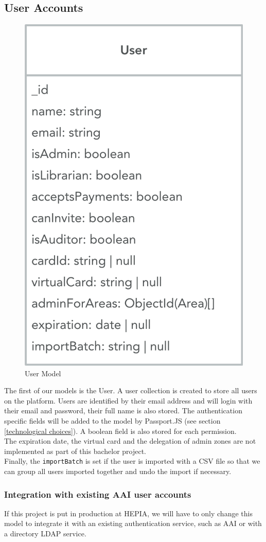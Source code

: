 \documentclass[11pt,a4paper]{report}
\begin{document}
\subsection{User Accounts}
\begin{figure}[H]
\begin{center}
	\includegraphics[width=.4\textwidth]{assets/user_model}
	\caption{User Model}
\end{center}
\end{figure}

The first of our models is the User. A user collection is created to store all users on the platform. Users are identified by their email address and will login with their email and password, their full name is also stored. The authentication specific fields will be added to the model by Passport.JS (see section \ref{technological choices}). A boolean field is also stored for each permission.\\

The expiration date, the virtual card and the delegation of admin zones are not implemented as part of this bachelor project. \\

Finally, the \verb+importBatch+ is set if the user is imported with a CSV file so that we can group all users imported together and undo the import if necessary.
\subsubsection{Integration with existing AAI user accounts}
If this project is put in production at HEPIA, we will have to only change this model to integrate it with an existing authentication service, such as AAI or with a directory LDAP service.\\
\end{document}
